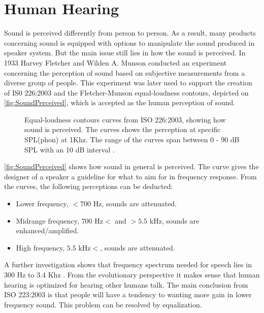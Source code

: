 \section{Human Hearing}

Sound is perceived differently from person to person. As a result, many products concerning sound is equipped with options to manipulate the sound produced in speaker system. But the main issue still lies in how the sound is perceived. In 1933 Harvey Fletcher and Wilden A. Munson conducted an experiment concerning the perception of sound based on subjective measurements from a diverse group of people. This experiment was later used to support the creation of IS0 226:2003 and the Fletcher-Munson equal-loudness contours, depicted on \autoref{fig:SoundPerceived}, which is accepted as the human perception of sound.

\begin{figure}[H]
\centering
{}

\caption{Equal-loudness contours curves from ISO 226:2003, showing how sound is perceived. The curves shows the perception at specific SPL(phon) at 1Khz. The range of the curves span between 0 - 90 dB SPL with an 10 dB interval .}
\label{fig:SoundPerceived}
\end{figure}
\autoref{fig:SoundPerceived} shows how sound in general is perceived. The curve gives the designer of a speaker a guideline for what to aim for in frequency response. From the curves, the following perceptions can be deducted:
\begin{itemize}
\item Lower frequency, $ < 700$ Hz, sounds are attenuated.
\item Midrange frequency, $700 \text{ Hz} < $ and $ > 5.5$ kHz, sounds are enhanced/amplified.
\item High frequency, $ 5.5 \text{ kHz} < $, sounds are attenuated.
\end{itemize}

A further investigation shows that frequency spectrum needed for speech lies in 300 Hz to 3.4 Khz \citep{sou:VoiceFundamentals}. From the evolutionary perspective it makes sense that human hearing is optimized for hearing other humans talk. The main conclusion from ISO 223:2003 is that people will have a tendency to wanting more gain in lower frequency sound. This problem can be resolved by equalization.


